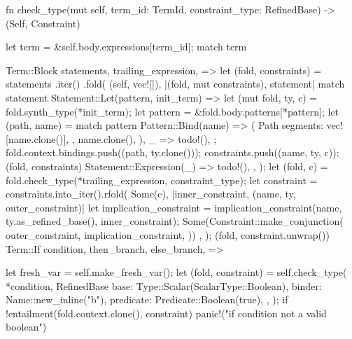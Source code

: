\documentclass[
  oneside,
  english,
  coorientadorbanca,
  noabntexcite
]{ufsc-thesis-rn46-2019}
\begin{document}
\begin{rustcode}
{    fn check_type(mut self, term_id: TermId, constraint_type: RefinedBase) -> (Self, Constraint) {
        let term = &self.body.expressions[term_id];
        match term {
            Term::Block {
                statements,
                trailing_expression,
            } => {
                let (fold, constraints) =
                    statements
                        .iter()
                        .fold(
                            (self, vec![]),
                            |(fold, mut constraints), statement| match statement {
                                Statement::Let(pattern, init_term) => {
                                    let (mut fold, ty, c) = fold.synth_type(*init_term);
                                    let pattern = &fold.body.patterns[*pattern];
                                    let (path, name) = match pattern {
                                        Pattern::Bind(name) => (
                                            Path {
                                                segments: vec![name.clone()],
                                            },
                                            name.clone(),
                                        ),
                                        _ => todo!(),
                                    };
                                    fold.context.bindings.push((path, ty.clone()));
                                    constraints.push((name, ty, c));
                                    (fold, constraints)
                                }
                                Statement::Expression(_) => todo!(),
                            },
                        );
                let (fold, c) = fold.check_type(*trailing_expression, constraint_type);
                let constraint = constraints.into_iter().rfold(
                    Some(c),
                    |inner_constraint, (name, ty, outer_constraint)| {
                        let implication_constraint =
                            implication_constraint(name, ty.as_refined_base(), inner_constraint);
                        Some(Constraint::make_conjunction(
                            outer_constraint,
                            implication_constraint,
                        ))
                    },
                );
                (fold, constraint.unwrap())
            }
            Term::If {
                condition,
                then_branch,
                else_branch,
            } => {
                let fresh_var = self.make_fresh_var();
                let (fold, constraint) = self.check_type(
                    *condition,
                    RefinedBase {
                        base: Type::Scalar(ScalarType::Boolean),
                        binder: Name::new_inline("b"),
                        predicate: Predicate::Boolean(true),
                    },
                );
                if !entailment(fold.context.clone(), constraint) {
                    panic!("if condition not a valid boolean")
                }

}}}}
\end{rustcode}
\end{document}
